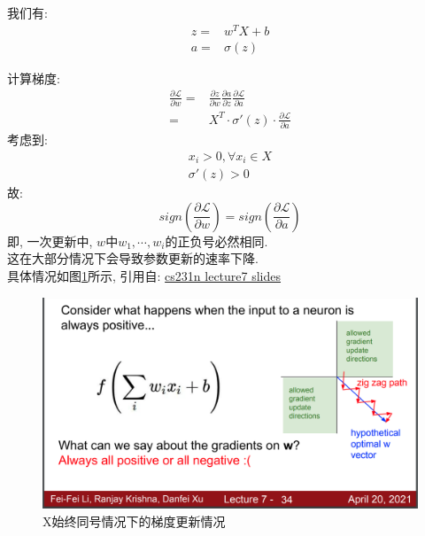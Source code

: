 \documentclass[]{subfiles}
\begin{document}
我们有:
\begin{align*}
z = & w^T X + b \\
a = & \sigma(z)
\end{align*}

计算梯度:
\begin{align*}
\frac{\partial \mathcal{L}}{\partial w}
= & \frac{\partial z}{\partial w}
    \frac{\partial a}{\partial z}
    \frac{\partial \mathcal{L}}{\partial a} \\
= & X^T \cdot \sigma'(z) \cdot
    \frac{\partial \mathcal{L}}{\partial a}
\end{align*}
考虑到:
\begin{align*}
x_i > 0, \forall x_i \in X \\
\sigma'(z) > 0
\end{align*}
故:
$$
sign(\frac{\partial \mathcal{L}}{\partial w})
= sign(\frac{\partial \mathcal{L}}{\partial a})
$$
即, 一次更新中, $w$中$w_1, \cdots, w_i$的正负号必然相同.\\
这在大部分情况下会导致参数更新的速率下降.\\
具体情况如图\ref{img4-1}所示, 引用自: \href{http://cs231n.stanford.edu/slides/2021/lecture_7.pdf}{cs231n lecture7 slides}

\begin{figure}
    \centering
    \includegraphics[width=.9\textwidth]{../figure/4-1.png}
    \caption{X始终同号情况下的梯度更新情况}
    \label{img4-1}
\end{figure}
\end{document}
